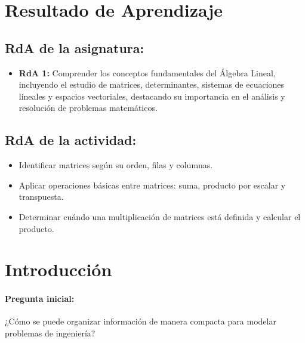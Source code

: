 \documentclass[a4,11pt]{aleph-notas}
\begin{document}
\encabezado

\section*{Resultado de Aprendizaje}  

\subsection*{RdA de la asignatura:}  
\begin{itemize}[leftmargin=*]  
    \item \textbf{RdA 1:} Comprender los conceptos
fundamentales del Álgebra Lineal, incluyendo el estudio de matrices, determinantes, sistemas de ecuaciones lineales y espacios vectoriales, destacando su importancia en el análisis y resolución de problemas matemáticos. 
\end{itemize}  

\subsection*{RdA de la actividad:}  
\begin{itemize}[leftmargin=*]  
    \item Identificar matrices según su orden, filas y columnas.  
    \item Aplicar operaciones básicas entre matrices: suma, producto por escalar y transpuesta.  
    \item Determinar cuándo una multiplicación de matrices está definida y calcular el producto.  
\end{itemize}  

\section*{Introducción}  

\paragraph{Pregunta inicial:}  
¿Cómo se puede organizar información de manera compacta para modelar problemas de ingeniería?

\end{document}
